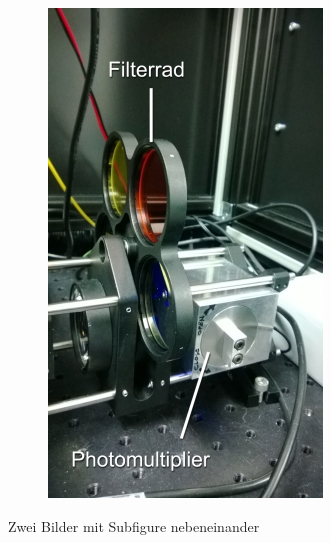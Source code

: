 \begin{figure}
\begin{subfigure}[b]{0.5\linewidth}
\end{subfigure}
\begin{subfigure}[b]{0.5\linewidth}
\includegraphics[width=0.98\linewidth]{IMAGE/pmt.png}\label{fig:pmt}
\end{subfigure}

\caption{Zwei Bilder mit Subfigure nebeneinander}
\end{figure}
\clearpage

